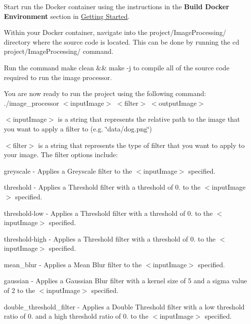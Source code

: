 \begin{DoxyEnumerate}
\item Start run the Docker container using the instructions in the {\bfseries Build Docker Environment} section in \hyperlink{getting-started}{Getting Started}.
\item Within your Docker container, navigate into the {\ttfamily project/\+Image\+Processing/} directory where the source code is located. This can be done by running the {\ttfamily cd project/\+Image\+Processing/} command.
\item Run the command {\ttfamily make clean \&\& make -\/j} to compile all of the source code required to run the image processor.
\item You are now ready to run the project using the following command\+: {\ttfamily ./image\+\_\+processor $<$input\+Image$>$ $<$filter$>$ $<$output\+Image$>$}
\begin{DoxyEnumerate}
\item {\ttfamily $<$input\+Image$>$} is a string that represents the relative path to the image that you want to apply a filter to (e.\+g. {\ttfamily \char`\"{}data/dog.\+png\char`\"{}})
\item {\ttfamily $<$filter$>$} is a string that represents the type of filter that you want to apply to your image. The filter options include\+:
\begin{DoxyEnumerate}
\item greyscale -\/ Applies a Greyscale filter to the {\ttfamily $<$input\+Image$>$} specified.
\item threshold -\/ Applies a Threshold filter with a threshold of 0. to the {\ttfamily $<$input\+Image$>$} specified.
\item threshold-\/low -\/ Applies a Threshold filter with a threshold of 0. to the {\ttfamily $<$input\+Image$>$} specified.
\item threshold-\/high -\/ Applies a Threshold filter with a threshold of 0. to the {\ttfamily $<$input\+Image$>$} specified.
\item mean\+\_\+blur -\/ Applies a Mean Blur filter to the {\ttfamily $<$input\+Image$>$} specified.
\item gaussian -\/ Applies a Gaussian Blur filter with a kernel size of 5 and a sigma value of 2 to the {\ttfamily $<$input\+Image$>$} specified.
\item double\+\_\+threshold\+\_\+filter -\/ Applies a Double Threshold filter with a low threshold ratio of 0. and a high threshold ratio of 0. to the {\ttfamily $<$input\+Image$>$} specified.

\end{DoxyEnumerate}
\end{DoxyEnumerate}
\end{DoxyEnumerate}
